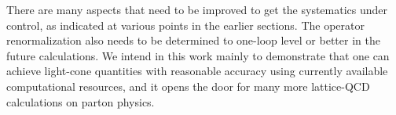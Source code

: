 There are many aspects that need to be improved to get the systematics under control, as indicated at various points in the earlier sections. The operator renormalization also needs to be determined to one-loop level or better in the future calculations. We intend in this work mainly to demonstrate that one can achieve light-cone quantities with reasonable accuracy using currently available computational resources, and it opens the door for many more lattice-QCD calculations on parton physics.
